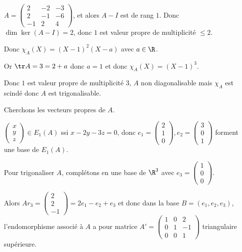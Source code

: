 \begin{exemple}
    $A = \begin{pmatrix}
        2 & -2 & -3 \\
        2 & -1 & -6 \\
        -1 & 2 & 4
    \end{pmatrix}$, et alors $A - I$ est de rang $1$. Donc $\dim \ker (A - I) = 2$, donc 
    $1$ est valeur propre de multiplicité $\leqslant 2$.

    Donc $\chi_A(X) = (X - 1)^2 (X - a)$ avec $a \in \R$.

    Or $\tr A = 3 = 2 + a$ donc $a = 1$ et donc $\chi_A(X) = (X - 1)^3$.

    Donc $1$ est valeur propre de multiplicité $3$, $A$ non diagonalisable
    mais $\chi_A$ est scindé donc $A$ est trigonalisable.

    \avspace Cherchons les vecteurs propres de $A$. 

    $\begin{pmatrix}
        x \\
        y \\
        z
    \end{pmatrix} \in E_1(A)$ ssi $x - 2y - 3z = 0$, donc $e_1 = \begin{pmatrix}
        2 \\
        1 \\
        0
    \end{pmatrix}, e_2 = \begin{pmatrix}
        3 \\
        0 \\
        1
    \end{pmatrix}$ forment une base de $E_1(A)$.

    Pour trigonaliser $A$, complétons en une base de $\R^3$ avec $e_3 = \begin{pmatrix}
        1 \\
        0 \\
        0
    \end{pmatrix}$.

    Alors $Ar_3 = \begin{pmatrix}
        2 \\
        2 \\
        -1
    \end{pmatrix} = 2 e_1 - e_2 + e_3$ 
    et donc dans la base $B = (e_1, e_2, e_3)$, l'endomorphisme associé à $A$ a pour matrice 
    $A' = \begin{pmatrix}
        1 & 0 & 2 \\
        0 & 1 & -1 \\
        0 & 0 & 1
    \end{pmatrix}$ triangulaire supérieure.
\end{exemple}


